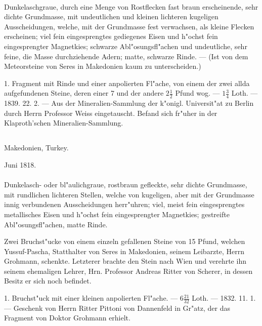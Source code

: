 \documentclass[a4paper, 11pt, oneside, polutonikogreek, german]{article}
\begin{document}
\paragraph{}
Dunkelaschgraue, durch eine Menge von Rostflecken fast braun erscheinende, sehr dichte Grundmasse, mit undeutlichen und kleinen lichteren kugeligen Ausscheidungen, welche, mit der Grundmasse fest verwachsen, als kleine Flecken erscheinen; viel fein eingesprengtes gediegenes Eisen und h"ochst fein eingesprengter Magnetkies; schwarze Abl"osungsfl"achen und undeutliche, sehr feine, die Masse durchziehende Adern; matte, schwarze Rinde. --- (Ist von dem Meteorsteine von Seres in Makedonien kaum zu unterscheiden.)

1. Fragment mit Rinde und einer anpolierten Fl"ache, von einem der zwei allda aufgefundenen Steine, deren einer 7 und der andere $2\frac{1}{2}$ Pfund wog. --- $1\frac{3}{4}$ Loth. --- 1839. 22. 2. --- Aus der Mineralien-Sammlung der k"onigl. Universit"at zu Berlin durch Herrn Professor Weiss eingetauscht. Befand sich fr"uher in der Klaproth'schen Mineralien-Sammlung.
\subsection{}
\begin{center}

Makedonien, Turkey.

Juni 1818.
\end{center}
\paragraph{}
Dunkelasch- oder bl"aulichgraue, rostbraun gefleckte, sehr dichte Grundmasse, mit rundlichen lichteren Stellen, welche von kugeligen, aber mit der Grundmasse innig verbundenen Ausscheidungen herr"uhren; viel, meist fein eingesprengtes metallisches Eisen und h"ochst fein eingesprengter Magnetkies; gestreifte Abl"osungsfl"achen, matte Rinde.

Zwei Bruchst"ucke von einem einzeln gefallenen Steine von 15 Pfund, welchen Yussuf-Pascha, Statthalter von Seres in Makedonien, seinem Leibarzte, Herrn Grohmann, schenkte. Letzterer brachte den Stein nach Wien und verehrte ihn seinem ehemaligen Lehrer, Hrn. Professor Andreas Ritter von Scherer, in dessen Besitz er sich noch befindet.

1. Bruchst"uck mit einer kleinen anpolierten Fl"ache. --- $6\frac{21}{32}$ Loth. --- 1832. 11. 1. --- Geschenk von Herrn Ritter Pittoni von Dannenfeld in Gr"atz, der das Fragment von Doktor Grohmann erhielt.
\end{document}

